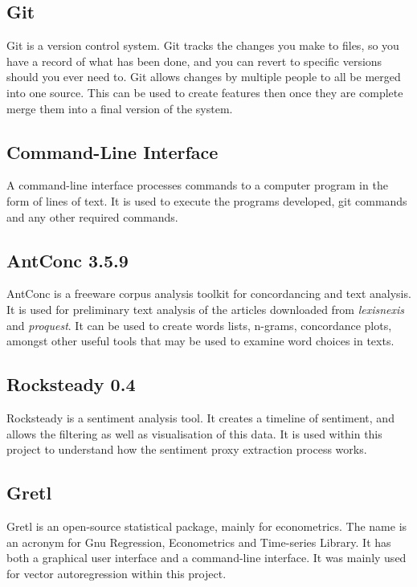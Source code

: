 \subsection{Git}

Git is a version control system. Git tracks the changes you make to files, so you have a record of what has been done, and you can revert to specific versions should you ever need to. Git allows changes by multiple people to all be merged into one source. This can be used to create features then once they are complete merge them into a final version of the system.

\subsection{Command-Line Interface}

A command-line interface processes commands to a computer program in the form of lines of text. It is used to execute the programs developed, git commands and any other required commands.

\subsection{AntConc 3.5.9}

AntConc is a freeware corpus analysis toolkit for concordancing and text analysis. It is used for preliminary text analysis of the articles downloaded from \emph{lexisnexis} and \emph{proquest}. It can be used to create words lists, n-grams, concordance plots, amongst other useful tools that may be used to examine word choices in texts.

\subsection{Rocksteady 0.4}

Rocksteady is a sentiment analysis tool. It creates a timeline of sentiment, and allows the filtering as well as visualisation of this data. It is used within this project to understand how the sentiment proxy extraction process works.

\subsection{Gretl}

Gretl is an open-source statistical package, mainly for econometrics. The name is an acronym for Gnu Regression, Econometrics and Time-series Library. It has both a graphical user interface and a command-line interface. It was mainly used for vector autoregression within this project.

